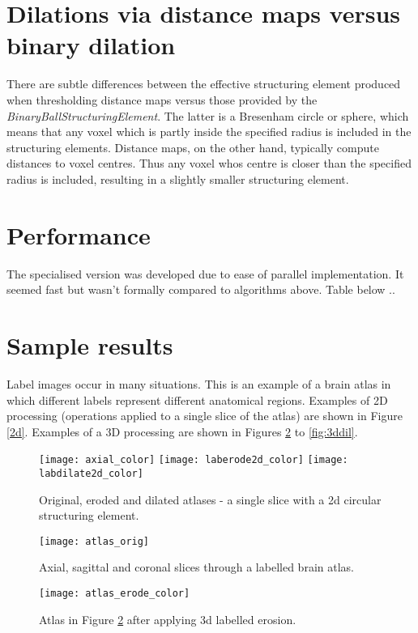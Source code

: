 \documentclass{InsightArticle}
\begin{document}
\section{Dilations via distance maps versus binary dilation}
There are subtle differences between the effective structuring element
produced when thresholding distance maps versus those provided by the
{\em BinaryBallStructuringElement}. The latter is a Bresenham circle
or sphere, which means that any voxel which is partly inside the
specified radius is included in the structuring elements. Distance
maps, on the other hand, typically compute distances to voxel
centres. Thus any voxel whos centre is closer than the specified
radius is included, resulting in a slightly smaller structuring
element.
\section{Performance}
The specialised version was developed due to ease of parallel
implementation. It seemed fast but wasn't formally compared to
algorithms above. Table below ..


\section{Sample results}
Label images occur in many situations. This is an example of a brain
atlas in which different labels represent different anatomical
regions. Examples of 2D processing (operations applied to a single
slice of the atlas) are shown in Figure \ref{2d}. Examples of a 3D
processing are shown in Figures \ref{fig:3dorig} to \ref{fig:3ddil}.

\begin{figure}[htbp]
\centering
\texttt{[image: axial\_color]}
\texttt{[image: laberode2d\_color]}
\texttt{[image: labdilate2d\_color]}
\caption{Original, eroded and dilated atlases - a single slice with a 2d circular structuring element.\label{fig:2d}}
\end{figure}

\begin{figure}[htbp]
\centering
\texttt{[image: atlas\_orig]}
\caption{Axial, sagittal and coronal slices through a labelled brain atlas.\label{fig:3dorig}}
\end{figure}

\begin{figure}[htbp]
\centering
\texttt{[image: atlas\_erode\_color]}
\caption{Atlas in Figure \ref{fig:3dorig} after applying 3d labelled erosion. \label{fig:3dero}}
\end{figure}
\end{document}

